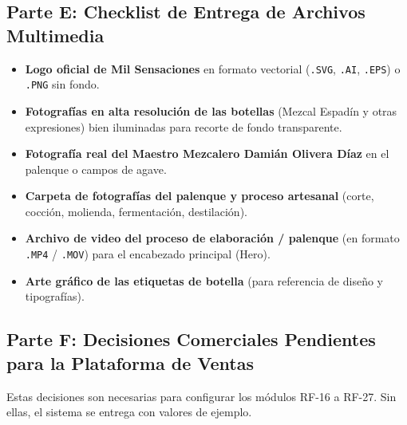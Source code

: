 \documentclass[11pt,letterpaper]{article}
\begin{document}
\subsection{Parte E: Checklist de Entrega de Archivos Multimedia}
\begin{itemize}[label=$\square$, leftmargin=2em, itemsep=0.4em]
    \item \textbf{Logo oficial de Mil Sensaciones} en formato vectorial (\texttt{.SVG}, \texttt{.AI}, \texttt{.EPS}) o \texttt{.PNG} sin fondo.
    \item \textbf{Fotografías en alta resolución de las botellas} (Mezcal Espadín y otras expresiones) bien iluminadas para recorte de fondo transparente.
    \item \textbf{Fotografía real del Maestro Mezcalero Damián Olivera Díaz} en el palenque o campos de agave.
    \item \textbf{Carpeta de fotografías del palenque y proceso artesanal} (corte, cocción, molienda, fermentación, destilación).
    \item \textbf{Archivo de video del proceso de elaboración / palenque} (en formato \texttt{.MP4} / \texttt{.MOV}) para el encabezado principal (Hero).
    \item \textbf{Arte gráfico de las etiquetas de botella} (para referencia de diseño y tipografías).
\end{itemize}

\subsection{Parte F: Decisiones Comerciales Pendientes para la Plataforma de Ventas}

Estas decisiones son necesarias para configurar los módulos RF-16 a RF-27. Sin ellas, el sistema se entrega con valores de ejemplo.
\end{document}
